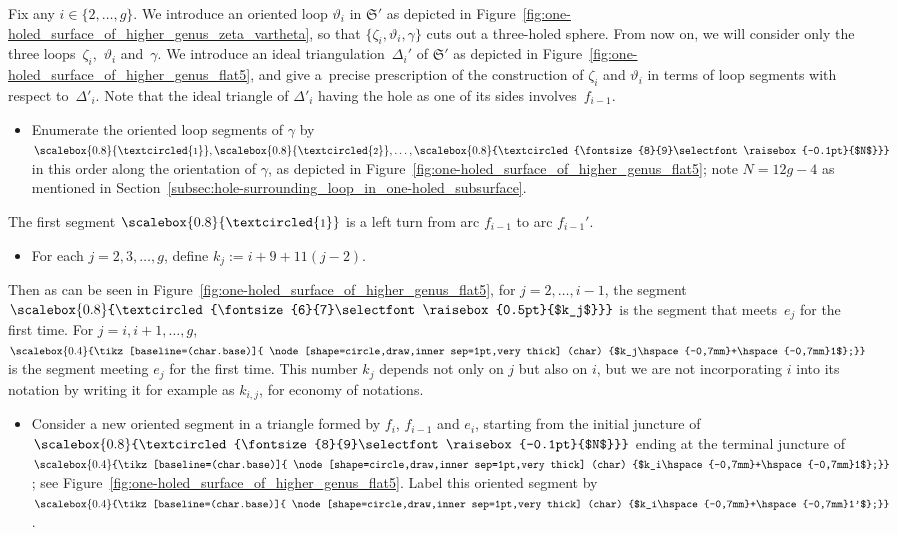 \documentclass[pdftex]{sigma}
\numberwithin{equation}{section}
\theoremstyle{definition}
\newcommand{\circled}[1]{\scalebox{0.8}{\textcircled{\fontsize{8}{9}\selectfont \raisebox{-0.1pt}{#1}}}}
\newcommand{\circledd}[1]{\scalebox{0.8}{\textcircled{\fontsize{6}{7}\selectfont \raisebox{0.5pt}{#1}}}}
\newcommand*\circleddd[1]{\scalebox{0.4}{\tikz[baseline=(char.base)]{
 \node[shape=circle,draw,inner sep=1pt,very thick] (char) {#1};}}}
\begin{document}
Fix any $i\in \{2,\dots,g\}$. We introduce an oriented loop $\vartheta_i$ in $\mathfrak{S}'$ as depicted in Figure~\ref{fig:one-holed_surface_of_higher_genus_zeta_vartheta}, so that $\{\zeta_i,\vartheta_i,\gamma\}$ cuts out a three-holed sphere. From now on, we will consider only the three loops~$\zeta_i$,~$\vartheta_i$ and~$\gamma$. We introduce an ideal triangulation~$\Delta_i'$ of $\mathfrak{S}'$ as depicted in Figure~\ref{fig:one-holed_surface_of_higher_genus_flat5}, and give a~precise prescription of the construction of $\zeta_i$ and $\vartheta_i$ in terms of loop segments with respect to~$\Delta'_i$. Note that the ideal triangle of $\Delta'_i$ having the hole as one of its sides involves~$f_{i-1}$.
\begin{itemize}\itemsep=0pt
\item Enumerate the oriented loop segments of $\gamma$ by $\circled{1},\circled{2},\dots,\circled{$N$}$ in this order along the orientation of $\gamma$, as depicted in Figure~\ref{fig:one-holed_surface_of_higher_genus_flat5}; note $N = 12g-4$ as mentioned in Section~\ref{subsec:hole-surrounding_loop_in_one-holed_subsurface}.
\end{itemize}
The first segment $\circled{1}$ is a left turn from arc $f_{i-1}$ to arc $f_{i-1}'$.
\begin{itemize}\itemsep=0pt
\item For each $j=2,3,\dots,g$, define $k_j := i+9+11(j-2)$.
\end{itemize}
Then as can be seen in Figure~\ref{fig:one-holed_surface_of_higher_genus_flat5}, for $j=2,\dots,i-1$, the segment $\circledd{$k_j$}$ is the segment that meets~$e_j$ for the first time. For $j=i,i+1,\dots,g$, $\circleddd{$k_j\hspace{-0,7mm}+\hspace{-0,7mm}1$}$ is the segment meeting $e_j$ for the first time. This number $k_j$ depends not only on $j$ but also on $i$, but we are not incorporating $i$ into its notation by writing it for example as $k_{i,j}$, for economy of notations.
\begin{itemize}\itemsep=0pt
\item Consider a new oriented segment in a triangle formed by $f_i$, $f_{i-1}$ and $e_i$, starting from the initial juncture of $\circled{$N$}$ ending at the terminal juncture of $\circleddd{$k_i\hspace{-0,7mm}+\hspace{-0,7mm}1$}$; see Figure~\ref{fig:one-holed_surface_of_higher_genus_flat5}. Label this oriented segment by $\circleddd{$k_i\hspace{-0,7mm}+\hspace{-0,7mm}1'$}$.
\end{itemize}
\end{document}
